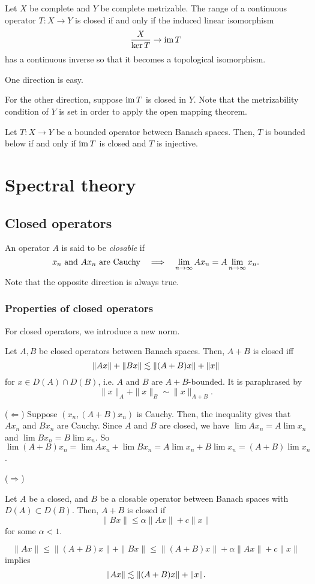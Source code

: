 \documentclass{../crs}
\begin{document}
\begin{thm}
Let $X$ be complete and $Y$ be complete metrizable.
The range of a continuous operator $T:X\to Y$ is closed if and only if the induced linear isomorphism
\[\frac X{\ker T}\to\im T\]
has a continuous inverse so that it becomes a topological isomorphism.
\end{thm}
\begin{pf}
One direction is easy.

For the other direction, suppose $\operatorname{im} T$ is closed in $Y$.
Note that the metrizability condition of $Y$ is set in order to apply the open mapping theorem.
\end{pf}
\begin{cor}
Let $T:X\to Y$ be a bounded operator between Banach spaces.
Then, $T$ is bounded below if and only if $\operatorname{im} T$ is closed and $T$ is injective.
\end{cor}



\section{Spectral theory}


\subsection{Closed operators}
\begin{defn}
An operator $A$ is said to be \emph{closable} if
\[x_n\text{ and }Ax_n\text{ are Cauchy}\impl\lim_{n\to\oo}Ax_n=A\lim_{n\to\oo}x_n.\]
Note that the opposite direction is always true.
\end{defn}
\subsubsection{Properties of closed operators}
For closed operators, we introduce a new norm. 
\begin{thm}
Let $A,B$ be closed operators between Banach spaces.
Then, $A+B$ is closed iff
\[\|Ax\|+\|Bx\|\lesssim\|(A+B)x\|+\|x\|\]
for $x\in D(A)\cap D(B)$, i.e. $A$ and $B$ are $A+B$-bounded.
It is paraphrased by
\[\|x\|_A+\|x\|_B\sim\|x\|_{A+B}.\]
\end{thm}
\begin{pf}
($\Leftarrow$) Suppose $(x_n,(A+B)x_n)$ is Cauchy.
Then, the inequality gives that $Ax_n$ and $Bx_n$ are Cauchy.
Since $A$ and $B$ are closed, we have $\lim Ax_n=A\lim x_n$ and $\lim Bx_n=B\lim x_n$.
So $\lim(A+B)x_n=\lim Ax_n+\lim Bx_n=A\lim x_n+B\lim x_n=(A+B)\lim x_n$.

($\Rightarrow$)
\end{pf}
\begin{thm}
Let $A$ be a closed, and $B$ be a closable operator between Banach spaces with $D(A)\subset D(B)$.
Then, $A+B$ is closed if
\[\|Bx\|\le\alpha\|Ax\|+c\|x\|\]
for some $\alpha<1$.
\end{thm}
\begin{pf}
\[\|Ax\|\le\|(A+B)x\|+\|Bx\|\le\|(A+B)x\|+\alpha\|Ax\|+c\|x\|\]
implies
\[\|Ax\|\lesssim\|(A+B)x\|+\|x\|.\]

\end{pf}
\end{document}
